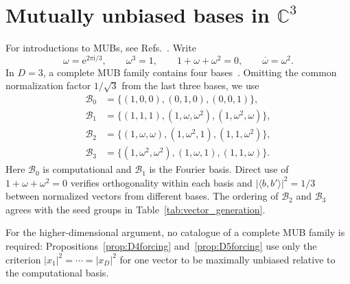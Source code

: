 \documentclass[%
  reprint,
  superscriptaddress,
  showpacs,
  showkeys,
  amsmath,amssymb,
  pra,
  longbibliography,
  floatfix,
  x11names
]{revtex4-2}
\newcommand{\ii}{\mathrm{i}}
\newenvironment{revision}{\begingroup\color{revisionblue}}{\endgroup}
\begin{document}


\bigskip
\appendix

\begin{revision}
\section{Mutually unbiased bases in $\mathbb{C}^3$}
\label{appendix:MUBsD3}

For introductions to MUBs, see Refs.~\cite{Schwinger.60,WooFie,Brierley2009,springerlink:10.1007/978-3-540-24633-6_10,durt,mcnulty2024mutually}.  Write
\[
\omega=\mathrm{e}^{2\pi\ii{}/3},\qquad
\omega^3=1,\qquad 1+\omega+\omega^2=0,
\qquad \overline{\omega}=\omega^2.
\]
In $D=3$, a complete MUB family contains four bases~\cite{ivanovic-1997}.  Omitting the common normalization factor $1/\sqrt{3}$ from the last three bases, we use
\begin{align}
\mathcal{B}_0&=\{(1,0,0),(0,1,0),(0,0,1)\}, \label{eq:B0_3}\\
\mathcal{B}_1&=\{(1,1,1),(1,\omega,\omega^2),(1,\omega^2,\omega)\}, \label{eq:B1_3}\\
\mathcal{B}_2&=\{(1,\omega,\omega),(1,\omega^2,1),(1,1,\omega^2)\}, \label{eq:B2_3}\\
\mathcal{B}_3&=\{(1,\omega^2,\omega^2),(1,\omega,1),(1,1,\omega)\}. \label{eq:B3_3}
\end{align}
Here $\mathcal{B}_0$ is computational and $\mathcal{B}_1$ is the Fourier basis.  Direct use of $1+\omega+\omega^2=0$ verifies orthogonality within each basis and $|\langle b,b'\rangle|^2=1/3$ between normalized vectors from different bases.  The ordering of $\mathcal{B}_2$ and $\mathcal{B}_3$ agrees with the seed groups in Table~\ref{tab:vector_generation}.

For the higher-dimensional argument, no catalogue of a complete MUB family is required: Propositions~\ref{prop:D4forcing} and~\ref{prop:D5forcing} use only the criterion $|x_1|^2=\cdots=|x_D|^2$ for one vector to be maximally unbiased relative to the computational basis.
\end{revision}
\end{document}
